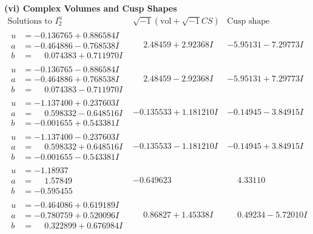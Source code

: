 \documentclass[1p]{elsarticle_modified}
\theoremstyle{definition}
\newcommand{\I}{\sqrt{-1}}
\begin{document}
\newpage\flushleft \textbf{(vi) Complex Volumes and Cusp Shapes}
$$\begin{array}{c|c|c}  
\text{Solutions to }I^u_{2}& \I (\text{vol} + \sqrt{-1}CS) & \text{Cusp shape}\\
 \hline 
\begin{aligned}
u &= -0.136765 + 0.886584 I \\
a &= -0.464886 - 0.768538 I \\
b &= \phantom{-}0.074383 + 0.711970 I\end{aligned}
 & \phantom{-}2.48459 + 2.92368 I & -5.95131 - 7.29773 I \\ \hline\begin{aligned}
u &= -0.136765 - 0.886584 I \\
a &= -0.464886 + 0.768538 I \\
b &= \phantom{-}0.074383 - 0.711970 I\end{aligned}
 & \phantom{-}2.48459 - 2.92368 I & -5.95131 + 7.29773 I \\ \hline\begin{aligned}
u &= -1.137400 + 0.237603 I \\
a &= \phantom{-}0.598332 - 0.648516 I \\
b &= -0.001655 + 0.543381 I\end{aligned}
 & -0.135533 + 1.181210 I & -0.14945 - 3.84915 I \\ \hline\begin{aligned}
u &= -1.137400 - 0.237603 I \\
a &= \phantom{-}0.598332 + 0.648516 I \\
b &= -0.001655 - 0.543381 I\end{aligned}
 & -0.135533 - 1.181210 I & -0.14945 + 3.84915 I \\ \hline\begin{aligned}
u &= -1.18937\phantom{ +0.000000I} \\
a &= \phantom{-}1.57849\phantom{ +0.000000I} \\
b &= -0.595455\phantom{ +0.000000I}\end{aligned}
 & -0.649623\phantom{ +0.000000I} & \phantom{-}4.33110\phantom{ +0.000000I} \\ \hline\begin{aligned}
u &= -0.464086 + 0.619189 I \\
a &= -0.780759 + 0.520096 I \\
b &= \phantom{-}0.322899 + 0.676984 I\end{aligned}
 & \phantom{-}0.86827 + 1.45338 I & \phantom{-}0.49234 - 5.72010 I \\ \hline\begin{aligned}

\end{aligned}
\end{array}$$
\end{document}
